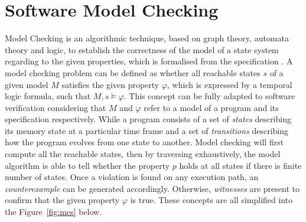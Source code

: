 \section{Software Model Checking} \label{sec:mc}
Model Checking is an algorithmic technique, based on graph theory, automata theory and logic, \cite{Vardi2005} to establish the correctness of the model of a state system regarding to the given properties, which is formalised from the specification \cite{Clarke:2000:MC:332656, Clarke:2008:BMC:1423535.1423536}. A model checking problem can be defined as whether all reachable states $s$ of a given model $M$ satisfies the given property $\varphi$, which is expressed by a temporal logic formula, such that $M, s \models \varphi$. This concept can be fully adapted to software verification considering that $M$ and $\varphi$ refer to a model of a program and its specification respectively. While a program consists of a set of \textit{states} describing its memory state at a particular time frame and a set of \textit{transitions} describing how the program evolves from one state to another. Model checking will first compute all the reachable states, then by traversing exhaustively, the model algorithm is able to tell whether the property $p$ holds at all states if there is finite number of states. Once a violation is found on any execution path, an \textit{counterexample} can be generated accordingly. Otherwise, \textit{witnesses} are present to confirm that the given property $\varphi$ is true. These concepts are all simplified into the Figure~\ref{fig:mcs} below.



